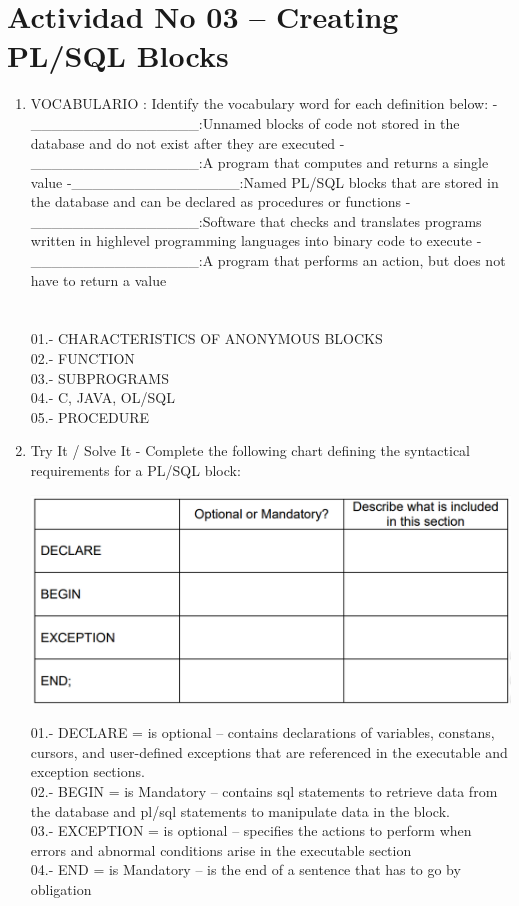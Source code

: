 \section{Actividad No 03 –  Creating PL/SQL Blocks} 
		
\begin{enumerate}[1.]
	\item VOCABULARIO :
	\subitem Identify the vocabulary word for each definition below:
	-\_\_\_\_\_\_\_\_\_\_\_\_\_\_\_\_:Unnamed blocks of code not stored in the database and do not exist after they are executed
	-\_\_\_\_\_\_\_\_\_\_\_\_\_\_\_\_:A program that computes and returns a single value
	-\_\_\_\_\_\_\_\_\_\_\_\_\_\_\_\_:Named PL/SQL blocks that are stored in the database and can be declared as procedures or functions
	-\_\_\_\_\_\_\_\_\_\_\_\_\_\_\_\_:Software that checks and translates programs written in highlevel programming languages into binary code to execute
	-\_\_\_\_\_\_\_\_\_\_\_\_\_\_\_\_:A program that performs an action, but does not have to return a value
	\\\\
	\\01.- CHARACTERISTICS OF ANONYMOUS BLOCKS
	\\02.- FUNCTION
	\\03.- SUBPROGRAMS
	\\04.- C, JAVA, OL/SQL
	\\05.- PROCEDURE

	\item Try It / Solve It
	- Complete the following chart defining the syntactical requirements for a PL/SQL block:
	\begin{center}
	\includegraphics[width=15cm]{./Imagenes/actividad01}  
	\end{center}	

	   01.- DECLARE	= is optional -- contains declarations of variables, constans, cursors, and user-defined exceptions that are referenced in the executable and exception sections.
	\\02.- BEGIN		= is Mandatory -- contains sql statements to retrieve data from the database and pl/sql statements to manipulate data in the block.
	\\03.- EXCEPTION	= is optional -- specifies the actions to perform when errors and abnormal conditions arise in the executable section
	\\04.- END		= is Mandatory -- is the end of a sentence that has to go by obligation\\


\end{enumerate}
